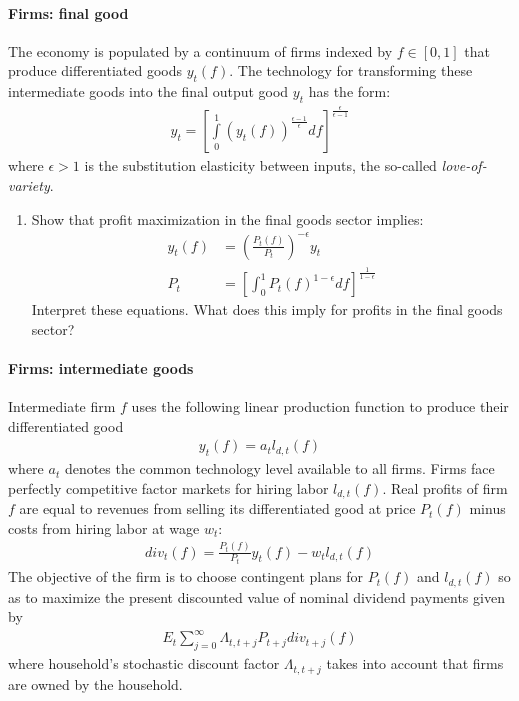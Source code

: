 \paragraph{Firms: final good}
The economy is populated by a continuum of firms indexed by \(f \in [0,1]\) that produce differentiated goods \(y_t(f)\).
The technology for transforming these intermediate goods into the final output good \(y_t\) has the \textcite{Dixit.Stiglitz_1977_MonopolisticCompetitionOptimum} form:
\begin{align}
y_t = {\left[\int\limits_0^1 {(y_t(f))}^{\frac{\epsilon-1}{\epsilon}}df\right]}^{\frac{\epsilon}{\epsilon-1}} \label{eq:Firms_DS_Aggregator}
\end{align}
where \(\epsilon>1\) is the substitution elasticity between inputs, the so-called \emph{love-of-variety}. 
\begin{enumerate}[resume]
\item Show that profit maximization in the final goods sector implies:
\begin{align*}
y_t(f) &= {\left(\frac{P_t(f)}{P_t}\right)}^{-\epsilon} y_t
\\
P_t &= {\left[\int_{0}^{1} P_t(f)^{1-\epsilon}df\right]}^{\frac{1}{1-\epsilon}}
\end{align*}
Interpret these equations. What does this imply for profits in the final goods sector?
\end{enumerate}

\paragraph{Firms: intermediate goods}
Intermediate firm \(f\) uses the following linear production function to produce their differentiated good
\begin{align}
y_t(f) = a_t l_{d,t}(f) \label{eq:Firms_ProductionFunction}
\end{align}
where \(a_t\) denotes the common technology level available to all firms.
Firms face perfectly competitive factor markets for hiring labor \(l_{d,t}(f)\).
Real profits of firm \(f\) are equal to revenues from selling its differentiated good at price \(P_t(f)\) minus costs from hiring labor at wage \(w_t\):
\begin{align}
{div}_t(f) = \frac{P_t(f)}{P_t} y_t(f) - w_t l_{d,t}(f) \label{eq:Firms.Profits}
\end{align}
The objective of the firm is to choose contingent plans for \(P_t(f)\) and \(l_{d,t}(f)\) so as to maximize the present discounted value of nominal dividend payments given by
\begin{align*}
E_t \sum_{j=0}^{\infty}\Lambda_{t,t+j} P_{t+j} div_{t+j}(f)
\end{align*}
where household's stochastic discount factor \(\Lambda_{t,t+j}\) takes into account that firms are owned by the household.

